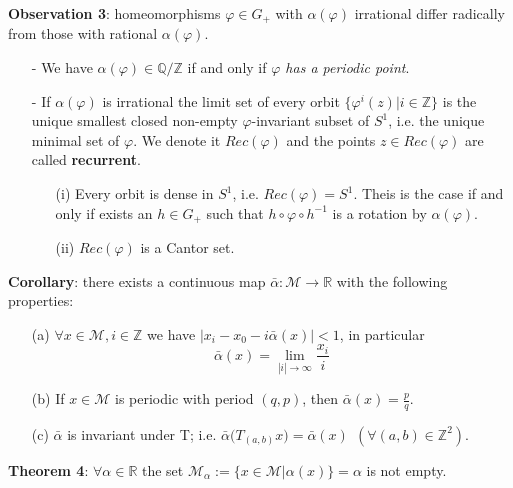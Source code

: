\documentclass{article}
\begin{document}
\noindent \textbf{Observation 3}: homeomorphisms $\varphi \in G_{+}$ with $\alpha ( \varphi )$ irrational differ radically from those with rational $\alpha ( \varphi )$.
\begin{itemize}
	\item[-] We have $\alpha ( \varphi ) \in \mathbb{Q} / \mathbb{Z}$ if and only if \textit{$\varphi$ has a periodic point}.
	\item[-] If $\alpha ( \varphi )$ is irrational the limit set of every orbit $ \{ \varphi^{i} (z) | i \in \mathbb{Z} \}$ is the unique smallest closed non-empty $\varphi$-invariant subset of $S^{1}$, i.e. the unique minimal set of $\varphi$. We denote it $Rec(\varphi)$ and the points $z \in Rec(\varphi)$ are called \textbf{recurrent}.
	\begin{itemize}
		\item[(i)] Every orbit is dense in $S^{1}$, i.e. $Rec(\varphi) = S^1$. Theis is the case if and only if exists an $h \in G_{+}$ such that $h \circ \varphi \circ h^{-1}$ is a rotation by $\alpha ( \varphi)$.
		\item[(ii)] $Rec(\varphi)$ is a Cantor set.
	\end{itemize}
\end{itemize}


\noindent \textbf{Corollary}: there exists a continuous map $\bar{\alpha}: \mathcal{M} \rightarrow \mathbb{R}$ with the following properties:
	\begin{itemize}
		\item[(a)] $\forall x \in \mathcal{M}, i \in \mathbb{Z}$ we have $| x_{i} - x_{0} - i \bar{\alpha} ( x ) | < 1$, in particular 
			$$
				\bar{\alpha} (x) = \lim_{|i| \rightarrow \infty} \frac{x_i}{i}
			$$
		\item[(b)] If $x \in \mathcal{M}$ is periodic with period $(q, p)$, then $\bar{\alpha} (x) = \frac{p}{q}$.
		\item[(c)] $\bar{\alpha}$ is invariant under T; i.e. $\bar{\alpha} \big( T_{(a, b)} x \big) = \bar{\alpha} (x) \ \ (\forall (a, b) \in \mathbb{Z}^{2})$.
	\end{itemize}

\noindent \textbf{Theorem 4}: $\forall \alpha \in \mathbb{R}$ the set $\mathcal{M}_{\alpha} := \{ x \in \mathcal{M} | \alpha(x) \} = \alpha$ is not empty.
\end{document}

